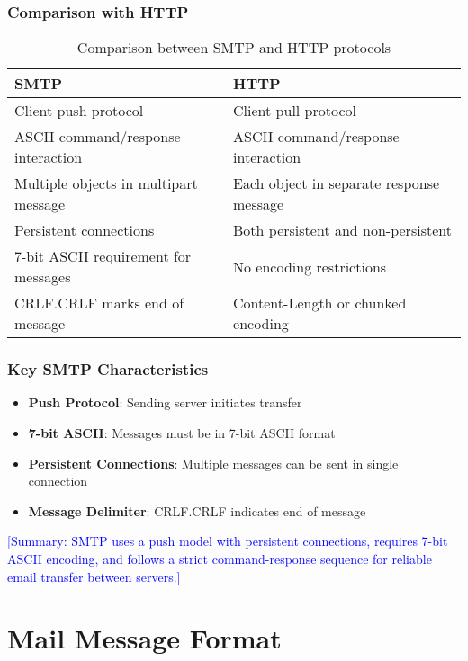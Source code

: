\documentclass[12pt]{article}
\begin{document}
\subsubsection{Comparison with HTTP}
\begin{table}[h]
    \centering
    \begin{tabular}{p{6cm}p{6cm}}
        \toprule
        \textbf{SMTP}                         & \textbf{HTTP}                            \\
        \midrule
        Client push protocol                  & Client pull protocol                     \\
        ASCII command/response interaction    & ASCII command/response interaction       \\
        Multiple objects in multipart message & Each object in separate response message \\
        Persistent connections                & Both persistent and non-persistent       \\
        7-bit ASCII requirement for messages  & No encoding restrictions                 \\
        CRLF.CRLF marks end of message        & Content-Length or chunked encoding       \\
        \bottomrule
    \end{tabular}
    \caption{Comparison between SMTP and HTTP protocols}
\end{table}

\subsubsection{Key SMTP Characteristics}
\begin{itemize}
    \item \textbf{Push Protocol}: Sending server initiates transfer
    \item \textbf{7-bit ASCII}: Messages must be in 7-bit ASCII format
    \item \textbf{Persistent Connections}: Multiple messages can be sent in single connection
    \item \textbf{Message Delimiter}: CRLF.CRLF indicates end of message
\end{itemize}

\textcolor{blue}{[Summary: SMTP uses a push model with persistent connections, requires 7-bit ASCII encoding, and follows a strict command-response sequence for reliable email transfer between servers.]}

\section{Mail Message Format}
\end{document}
